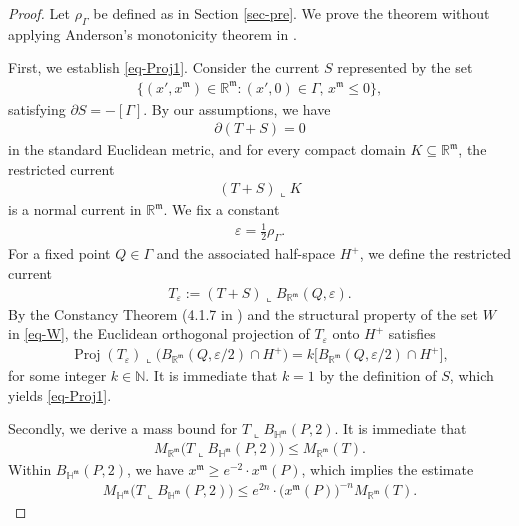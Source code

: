 \documentclass[11pt,reqno]{amsart}
\newcommand{\fm}{\mathfrak{m}}
\renewcommand{\epsilon}{\varepsilon}
\renewcommand{\leq}{\leqslant}
\renewcommand{\geq}{\geqslant}
\theoremstyle{definition}
\numberwithin{equation}{section}
\begin{document}
\begin{proof}
    Let $\rho_\Gamma$ be defined as in Section \ref{sec-pre}. We prove the theorem without applying Anderson's monotonicity theorem in \cite{Anderson1982}.

First, we establish \eqref{eq-Proj1}. Consider the current $S$ represented by the set
\begin{align}
    \bigl\{(x', x^\fm) \in \mathbb{R}^\fm: (x',0)\in \Gamma, \, x^\fm\leq 0\bigr\},
\end{align}
satisfying $\partial S = - [\Gamma]$. By our assumptions, we have
\begin{align}
    \partial (T+S) =0
\end{align}
in the standard Euclidean metric, and for every compact domain $K\subseteq \mathbb{R}^\fm$, the restricted current
\begin{align}
    (T+ S) \mathbin{\llcorner} K
\end{align}
is a normal current in $\mathbb{R}^\fm$. We fix a constant
\begin{align}
    \epsilon= \tfrac{1}{2}\rho_\Gamma.
\end{align}
For a fixed point $Q \in \Gamma$ and the associated half-space $H^+$, we define the restricted current
\begin{align}
    T_\epsilon:=(T+S) \mathbin{\llcorner} B_{\mathbb{R}^\fm}(Q, \epsilon).
\end{align}
By the Constancy Theorem (4.1.7 in \cite{Federer}) and the structural property of the set $W$ in \eqref{eq-W}, the Euclidean orthogonal projection of $T_\epsilon$ onto $H^+$ satisfies
\begin{align}
  \operatorname{Proj}(T_\epsilon)\mathbin{\llcorner} \bigl(B_{\mathbb{R}^\fm}(Q, \epsilon/2) \cap H^+\bigr)=
    k\bigl[B_{\mathbb{R}^\fm}(Q, \epsilon/2) \cap H^+\bigr],
\end{align}
for some integer $k\in \mathbb{N}$. It is immediate that $k=1$ by the definition of $S$, which yields \eqref{eq-Proj1}.
    
    Secondly, we derive a mass bound for $T \mathbin{\llcorner} B_{\mathbb{H}^\fm}(P, 2)$. It is immediate that
    \begin{align}
        M_{\mathbb{R}^\fm}\bigl(T \mathbin{\llcorner} B_{\mathbb{H}^\fm}(P, 2)\bigr) \leq M_{\mathbb{R}^\fm}(T).
    \end{align}
    Within $B_{\mathbb{H}^\fm}(P, 2)$, we have $x^\fm \geq e^{-2}\cdot x^\fm(P)$, which implies the estimate
    \begin{align}\label{eq-mass1}
        M_{\mathbb{H}^\fm}\bigl(T \mathbin{\llcorner} B_{\mathbb{H}^\fm}(P, 2)\bigr) \leq e^{2n}\cdot \bigl(x^\fm(P)\bigr)^{-n} M_{\mathbb{R}^\fm}(T).
    \end{align}


\end{proof}
\end{document}
